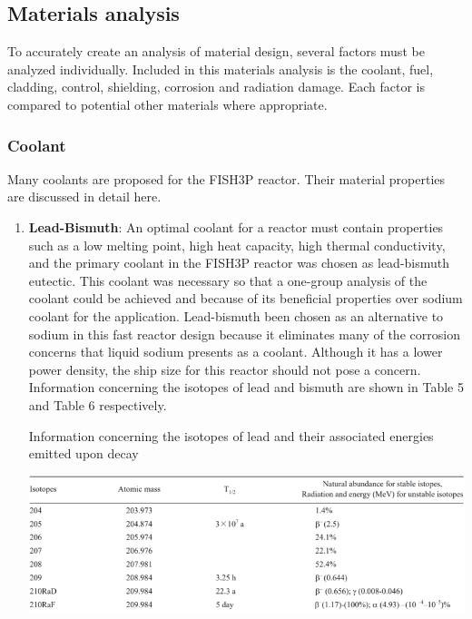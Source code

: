 \documentclass[12pt]{article}
\begin{document}
\subsection{Materials analysis}
To accurately create an analysis of material design, several factors must be analyzed individually.  Included in this materials analysis is the coolant, fuel, cladding, control, shielding, corrosion and radiation damage.  Each factor is compared to potential other materials where appropriate.
\subsubsection{Coolant}
Many coolants are proposed for the FISH3P reactor. Their material properties are discussed in detail here.
\begin{enumerate}
\item \textbf{Lead-Bismuth}:
An optimal coolant for a reactor must contain properties such as a low melting point, high heat capacity, high thermal conductivity, and the primary coolant in the FISH3P reactor was chosen as lead-bismuth eutectic.  This coolant was necessary so that a one-group analysis of the coolant could be achieved and because of its beneficial properties over sodium coolant for the application.  
Lead-bismuth been chosen as an alternative to sodium in this fast reactor design because it eliminates many of the corrosion concerns that liquid sodium presents as a coolant.  Although it has a lower power density, the ship size for this reactor should not pose a concern.  Information concerning the isotopes of lead and bismuth are shown in Table 5 and Table 6 respectively.

\begin{table}[H]
\begin{center}
 \caption{Information concerning the isotopes of lead and their associated energies emitted upon decay} \cite{LBE_properties}
 \label{t:lb-decay}  %
 \includegraphics[width=\textwidth]{tab-lb-decay-properties} %
\end{center}
\end{table}


\end{enumerate}
\end{document}
